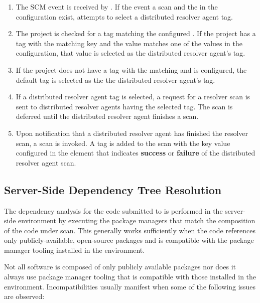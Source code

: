 \begin{enumerate}
  \item The SCM event is received by \cxoneflow.  If the event  a scan and
    the  in the \cxoneflow configuration exist, \cxoneflow attempts to select
    a distributed resolver agent tag. 
  \item The \cxone project is checked for a tag matching the configured .
    If the project has a tag with the matching key and the value matches one of the values in the 
    configuration, that value is selected as the distributed resolver agent's tag.
  \item If the \cxone project does not have a tag with the matching  and
     is configured, the default tag is selected as the the distributed resolver agent's tag.
  \item If a distributed resolver agent tag is selected, a request for a resolver scan is sent to distributed resolver agents having the selected tag.  The
    \cxone scan is deferred until the distributed resolver agent finishes a scan.
  \item Upon notification that a distributed resolver agent has finished the resolver scan, a \cxone scan is invoked.  A tag is added to the scan
    with the key value configured in the  element that indicates \textbf{success} or
    \textbf{failure} of the distributed resolver agent scan.
\end{enumerate}


\subsection{Server-Side Dependency Tree Resolution}

The dependency analysis for the code submitted to \cxone is performed
in the server-side \cxone environment by executing the package managers that match the composition of the code
under scan.  This generally works sufficiently when the code references only publicly-available, open-source
packages and is compatible with the package manager tooling installed in the \cxone environment.  

Not all software is composed of only publicly available packages nor does it always use package manager tooling
that is compatible with those installed in the \cxone environment.  Incompatibilities usually manifest
when some of the following issues are observed:

